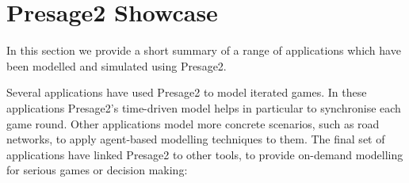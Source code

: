 \section{Presage2 Showcase}

In this section we provide a short summary of a range of applications which have
been modelled and simulated using Presage2.

Several applications have used Presage2 to model iterated games. In these
applications Presage2's time-driven model helps in particular to synchronise
each game round. Other applications model more concrete scenarios, such as
road networks, to apply agent-based modelling techniques to them. The final
set of applications have linked Presage2 to other tools, to provide on-demand
modelling for serious games or decision making:

